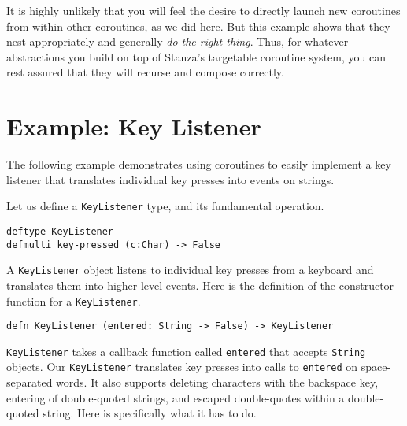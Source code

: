\documentclass[10pt,oneside]{book}
\begin{document}
It is highly unlikely that you will feel the desire to directly launch new coroutines from within other coroutines, as we did here. But this example shows that they nest appropriately and generally {\em do the right thing}. Thus, for whatever abstractions you build on top of Stanza's targetable coroutine system, you can rest assured that they will recurse and compose correctly. 

\section{Example: Key Listener}
The following example demonstrates using coroutines to easily implement a key listener that translates individual key presses into events on strings.

Let us define a \texttt{\frenchspacing KeyListener} type, and its fundamental operation.
\begin{lstlisting}
deftype KeyListener
defmulti key-pressed (c:Char) -> False
\end{lstlisting}
A \texttt{\frenchspacing KeyListener} object listens to individual key presses from a keyboard and translates them into higher level events. Here is the definition of the constructor function for a \texttt{\frenchspacing KeyListener}.
\begin{lstlisting}
defn KeyListener (entered: String -> False) -> KeyListener
\end{lstlisting}
\texttt{\frenchspacing KeyListener} takes a callback function called \texttt{\frenchspacing entered} that accepts \texttt{\frenchspacing String} objects. Our \texttt{\frenchspacing KeyListener} translates key presses into calls to \texttt{\frenchspacing entered} on space-separated words. It also supports deleting characters with the backspace key, entering of double-quoted strings, and escaped double-quotes within a double-quoted string. Here is specifically what it has to do.
\end{document}

